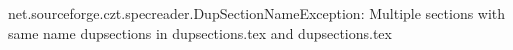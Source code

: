 net.sourceforge.czt.specreader.DupSectionNameException: Multiple sections with same name dupsections in dupsections.tex and dupsections.tex